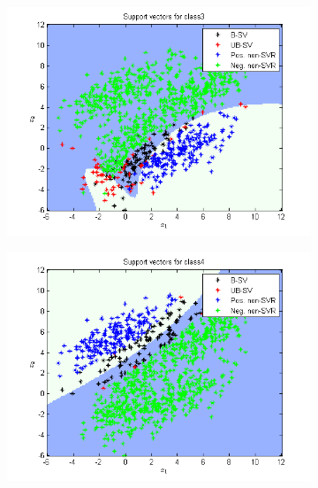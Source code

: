\documentclass{article}
\begin{document}
\begin{figure}
\begin{subfigure}{.5\textwidth}
  \centering
  \includegraphics[width=.8\linewidth]{Classification/1c/nu_g/sv3}
 
\end{subfigure}%
\begin{subfigure}{.5\textwidth}
  \centering
  \includegraphics[width=.8\linewidth]{Classification/1c/nu_g/sv4}
  
\end{subfigure}
\end{figure}

\end{document}
